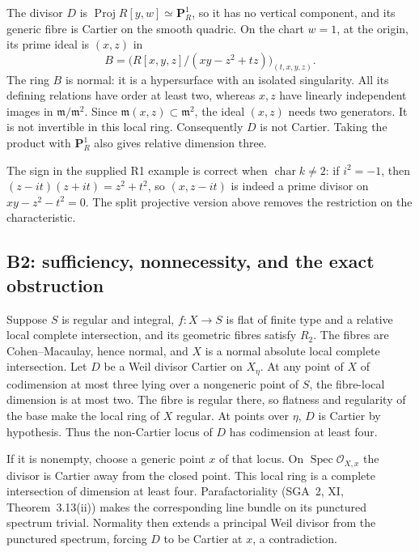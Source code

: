 The divisor $D$ is $\operatorname{Proj}R[y,w]\simeq\mathbf P^1_R$, so it has no
vertical component, and its generic fibre is Cartier on the smooth quadric.
On the chart $w=1$, at the origin, its prime ideal is $(x,z)$ in
\[
 B=\bigl(R[x,y,z]/(xy-z^2+tz)\bigr)_{(t,x,y,z)}.
\]
The ring $B$ is normal: it is a hypersurface with an isolated singularity.
All its defining relations have order at least two, whereas $x,z$ have
linearly independent images in $\mathfrak m/\mathfrak m^2$. Since
$\mathfrak m(x,z)\subset\mathfrak m^2$, the ideal $(x,z)$ needs two generators.
It is not invertible in this local ring. Consequently $D$ is not Cartier.
Taking the product with $\mathbf P^1_R$ also gives relative dimension three.

The sign in the supplied R1 example is correct when $\operatorname{char}k\ne2$:
if $i^2=-1$, then $(z-it)(z+it)=z^2+t^2$, so $(x,z-it)$ is indeed a prime
divisor on $xy-z^2-t^2=0$. The split projective version above removes the
restriction on the characteristic.

\subsection{B2: sufficiency, nonnecessity, and the exact obstruction}

Suppose $S$ is regular and integral, $f:X\to S$ is flat of finite type and a
relative local complete intersection, and its geometric fibres satisfy $R_2$.
The fibres are Cohen--Macaulay, hence normal, and $X$ is a normal absolute
local complete intersection. Let $D$ be a Weil divisor Cartier on $X_\eta$.
At any point of $X$ of codimension at most three lying over a nongeneric point
of $S$, the fibre-local dimension is at most two. The fibre is regular there,
so flatness and regularity of the base make the local ring of $X$ regular.
At points over $\eta$, $D$ is Cartier by hypothesis. Thus the non-Cartier locus
of $D$ has codimension at least four.

If it is nonempty, choose a generic point $x$ of that locus. On
$\operatorname{Spec}\mathcal O_{X,x}$ the divisor is Cartier away from the
closed point. This local ring is a complete intersection of dimension at least
four. Parafactoriality (SGA~2, XI, Theorem~3.13(ii)) makes the corresponding
line bundle on its punctured spectrum trivial. Normality then extends a
principal Weil divisor from the punctured spectrum, forcing $D$ to be Cartier
at $x$, a contradiction.

